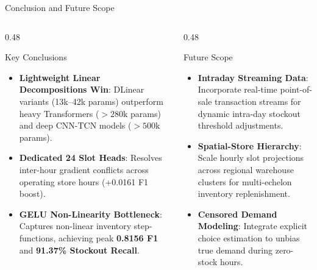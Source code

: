 \documentclass[10pt, aspectratio=169]{beamer}
\begin{document}
\begin{frame}{Conclusion and Future Scope}
  \begin{columns}[T]
    \begin{column}{0.48\textwidth}
      \begin{block}{Key Conclusions}
        \begin{itemize}
          \item \textbf{Lightweight Linear Decompositions Win}: DLinear variants (13k--42k params) outperform heavy Transformers ($>280\text{k}$ params) and deep CNN-TCN models ($>500\text{k}$ params).
          \item \textbf{Dedicated 24 Slot Heads}: Resolves inter-hour gradient conflicts across operating store hours (+0.0161 F1 boost).
          \item \textbf{GELU Non-Linearity Bottleneck}: Captures non-linear inventory step-functions, achieving peak \textbf{0.8156 F1} and \textbf{91.37\% Stockout Recall}.
        \end{itemize}
      \end{block}
    \end{column}
    
    \begin{column}{0.48\textwidth}
      \begin{exampleblock}{Future Scope}
        \begin{itemize}
          \item \textbf{Intraday Streaming Data}: Incorporate real-time point-of-sale transaction streams for dynamic intra-day stockout threshold adjustments.
          \item \textbf{Spatial-Store Hierarchy}: Scale hourly slot projections across regional warehouse clusters for multi-echelon inventory replenishment.
          \item \textbf{Censored Demand Modeling}: Integrate explicit choice estimation to unbias true demand during zero-stock hours.
        \end{itemize}
      \end{exampleblock}
    \end{column}
  \end{columns}
\end{frame}
\end{document}
